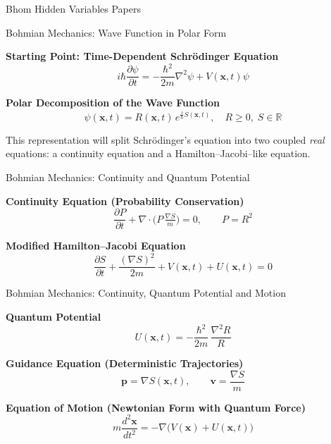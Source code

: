 \begin{frame}{Bhom Hidden Variables Papers}
\begin{minipage}{0.49\textwidth}
  \end{minipage}
\end{frame}

\begin{frame}{Bohmian Mechanics: Wave Function in Polar Form}

  \textbf{Starting Point: Time-Dependent Schrödinger Equation}
  \[
    i\hbar \frac{\partial \psi}{\partial t} 
      = -\frac{\hbar^2}{2m}\nabla^2\psi + V(\mathbf{x},t)\psi
  \]

  \pause

  \textbf{Polar Decomposition of the Wave Function}
  \[
    \psi(\mathbf{x},t) = R(\mathbf{x},t)\,e^{\tfrac{i}{\hbar}S(\mathbf{x},t)}, 
    \quad R \geq 0,\; S\in \mathbb{R}
  \]

  \pause

  This representation will split Schrödinger’s equation into two coupled \emph{real} equations:  
  a continuity equation and a Hamilton–Jacobi–like equation.  

\end{frame}

\begin{frame}{Bohmian Mechanics: Continuity and Quantum Potential}

  \textbf{Continuity Equation (Probability Conservation)}
  \[
    \frac{\partial P}{\partial t} 
      + \nabla\!\cdot\!\big(P\,\tfrac{\nabla S}{m}\big) = 0, 
    \qquad P = R^2
  \]

  \pause

  \textbf{Modified Hamilton–Jacobi Equation}
  \[
    \frac{\partial S}{\partial t} 
      + \frac{(\nabla S)^2}{2m} 
      + V(\mathbf{x},t) 
      + U(\mathbf{x},t) = 0
  \]
\end{frame}
  

\begin{frame}{Bohmian Mechanics: Continuity, Quantum Potential and Motion}

  \textbf{Quantum Potential}
  \[
    U(\mathbf{x},t) = -\frac{\hbar^2}{2m}\,\frac{\nabla^2 R}{R}
  \]

  \pause

  \textbf{Guidance Equation (Deterministic Trajectories)}
  \[
    \mathbf{p} = \nabla S(\mathbf{x},t), 
    \qquad \mathbf{v} = \frac{\nabla S}{m}
  \]

  \pause

  \textbf{Equation of Motion (Newtonian Form with Quantum Force)}
  \[
    m \frac{d^2 \mathbf{x}}{dt^2} = - \nabla \Big( V(\mathbf{x}) + U(\mathbf{x},t) \Big)
  \]

\end{frame}



